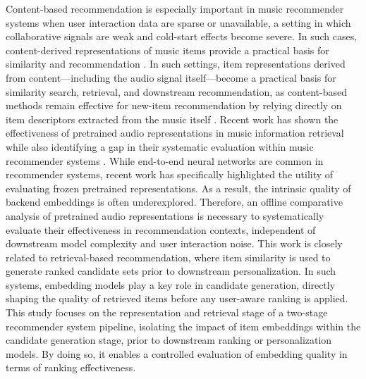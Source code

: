 \documentclass[sigconf]{acmart}
\begin{document}
Content-based recommendation is especially important in music recommender systems when user interaction data are sparse or unavailable, a setting in which collaborative signals are weak and cold-start effects become severe\cite{schedl2018}. In such cases, content-derived representations of music items provide a practical basis for similarity and recommendation \cite{deldjoo2024}. In such settings, item representations derived from content---including the audio signal itself---become a practical basis for similarity search, retrieval, and downstream recommendation, as content-based methods remain effective for new-item recommendation by relying directly on item descriptors extracted from the music itself \cite{deldjoo2024}. Recent work has shown the effectiveness of pretrained audio representations in music information retrieval while also identifying a gap in their systematic evaluation within music recommender systems \cite{tamm2024}. While end-to-end neural networks are common in recommender systems, recent work has specifically highlighted the utility of evaluating frozen pretrained representations. As a result, the intrinsic quality of backend embeddings is often underexplored. Therefore, an offline comparative analysis of pretrained audio representations is necessary to systematically evaluate their effectiveness in recommendation contexts, independent of downstream model complexity and user interaction noise. This work is closely related to retrieval-based recommendation, where item similarity is used to generate ranked candidate sets prior to downstream personalization. In such systems, embedding models play a key role in candidate generation, directly shaping the quality of retrieved items before any user-aware ranking is applied. This study focuses on the representation and retrieval stage of a two-stage recommender system pipeline, isolating the impact of item embeddings within the candidate generation stage, prior to downstream ranking or personalization models. By doing so, it enables a controlled evaluation of embedding quality in terms of ranking effectiveness.
\end{document}
